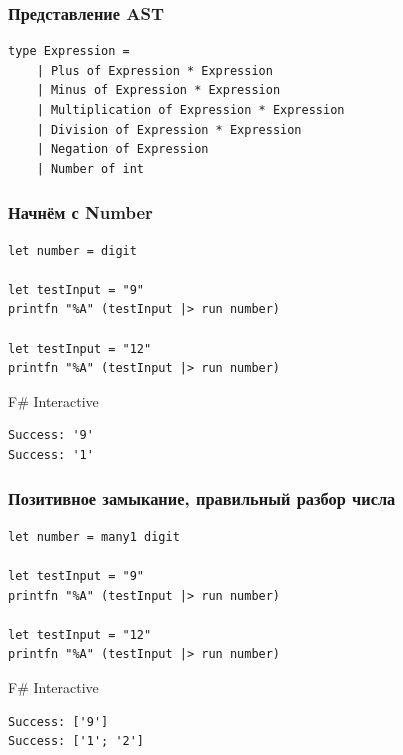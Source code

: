 \documentclass[xetex,mathserif,serif]{beamer}
\begin{document}
    \begin{frame}[fragile]
        \frametitle{Представление AST}
        \begin{verbatim}
type Expression =
    | Plus of Expression * Expression
    | Minus of Expression * Expression
    | Multiplication of Expression * Expression
    | Division of Expression * Expression
    | Negation of Expression
    | Number of int
        \end{verbatim}
    \end{frame}

    \begin{frame}[fragile]
        \frametitle{Начнём с Number}
        \begin{verbatim}
let number = digit

let testInput = "9"
printfn "%A" (testInput |> run number)

let testInput = "12"
printfn "%A" (testInput |> run number)
        \end{verbatim}

        \begin{exampleblock}{F\# Interactive}
            \begin{verbatim}
Success: '9'
Success: '1'
            \end{verbatim}
        \end{exampleblock}
    \end{frame}

    \begin{frame}[fragile]
        \frametitle{Позитивное замыкание, правильный разбор числа}
        \begin{verbatim}
let number = many1 digit

let testInput = "9"
printfn "%A" (testInput |> run number)

let testInput = "12"
printfn "%A" (testInput |> run number)
        \end{verbatim}

        \begin{exampleblock}{F\# Interactive}
            \begin{verbatim}
Success: ['9']
Success: ['1'; '2']
            \end{verbatim}
        \end{exampleblock}
    \end{frame}
\end{document}
